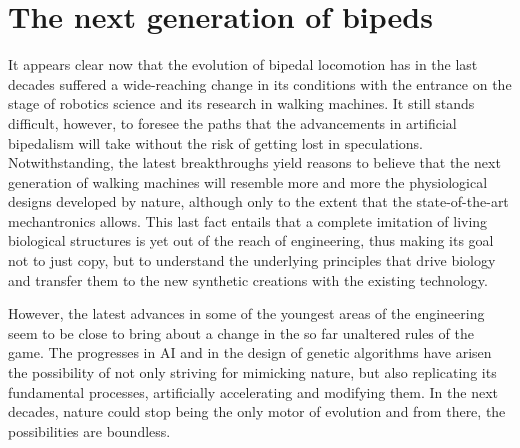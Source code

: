 
\section{The next generation of bipeds} %
\label{sec:the_next_generation_of_bipeds}
It appears clear now that the evolution of bipedal locomotion has in the last decades suffered a wide-reaching change in its conditions with the entrance on the stage of robotics science and its research in walking machines.
It still stands difficult, however, to foresee the paths that the advancements in artificial bipedalism will take without the risk of getting lost in speculations.
Notwithstanding, the latest breakthroughs yield reasons to believe that the next generation of walking machines will resemble more and more the physiological designs developed by nature, although only to the extent that the state-of-the-art mechantronics allows.
This last fact entails that a complete imitation of living biological structures is yet out of the reach of engineering, thus making its goal not to just copy, but to understand the underlying principles that drive biology and transfer them to the new synthetic creations with the existing technology.



However, the latest advances in some of the youngest areas of the engineering seem to be close to bring about a change in the so far unaltered rules of the game.
The progresses in AI and in the design of genetic algorithms have arisen the possibility of not only striving for mimicking nature, but also replicating its fundamental processes, artificially accelerating and modifying them.
In the next decades, nature could stop being the only motor of evolution and from there, the possibilities are boundless.


